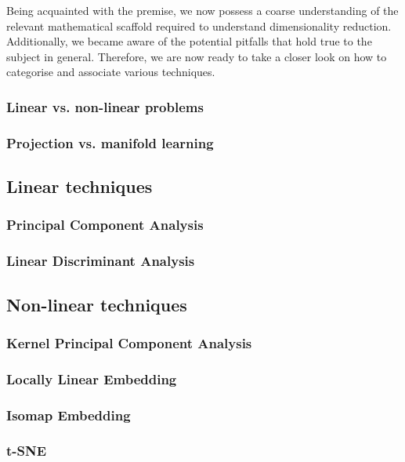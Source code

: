 Being acquainted with the premise, we now possess a coarse understanding of the relevant mathematical scaffold required to understand dimensionality reduction.
Additionally, we became aware of the potential pitfalls that hold true to the subject in general.
Therefore, we are now ready to take a closer look on how to categorise and associate various techniques.

\subsubsection{Linear vs. non-linear problems}

\clearpage

\subsubsection{Projection vs. manifold learning}

\clearpage




\subsection{Linear techniques}


\subsubsection{Principal Component Analysis}

\clearpage

\subsubsection{Linear Discriminant Analysis}

\clearpage





\subsection{Non-linear techniques}



\subsubsection{Kernel Principal Component Analysis}

\clearpage


\subsubsection{Locally Linear Embedding}

\clearpage


\subsubsection{Isomap Embedding}

\clearpage


\subsubsection{t-SNE}

\clearpage
